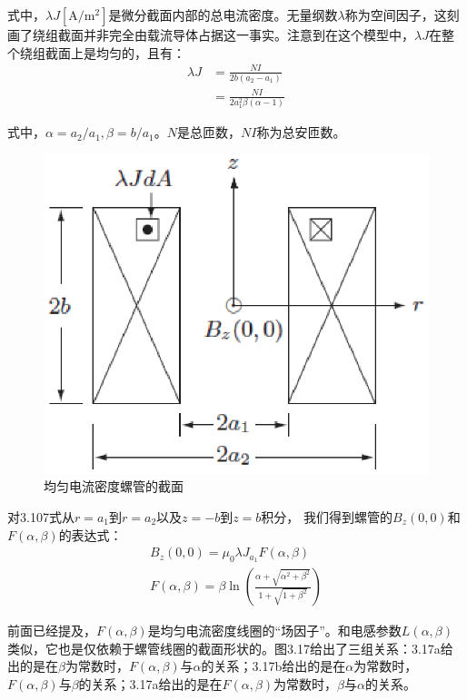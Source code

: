 式中，$\lambda J\mathrm{[A/m^2]}$是微分截面内部的总电流密度。无量纲数$\lambda$称为空间因子，这刻画了绕组截面并非完全由载流导体占据这一事实。注意到在这个模型中，$\lambda J$在整个绕组截面上是均匀的，且有：
\begin{equation}
\begin{split}
\lambda J&=\frac{NI}{2b(a_2-a_1)}\\
&=\frac{NI}{2a_1^2\beta(\alpha-1)}%
\end{split}
\end{equation}

式中，$\alpha=a_2/a_1,\beta=b/a_1$。$N$是总匝数，$NI$称为总安匝数。
\begin{figure}[htbp]
  \centering
 \includegraphics[scale=0.7]{chpt3/figs/fig3.16.eps}
  \caption{均匀电流密度螺管的截面}
\end{figure}

对3.107式从$r=a_1$到$r=a_2$以及$z=-b$到$z=b$积分，
我们得到螺管的$B_z(0,0)$和$F(\alpha,\beta)$的表达式：
\begin{eqnarray}
B_z(0,0)=\mu_0\lambda J_{a_1}F(\alpha,\beta)\\ %
F(\alpha,\beta)=\beta \ln\left(\frac{\alpha+\sqrt{\alpha^2+\beta^2}}{1+\sqrt{1+\beta^2}}\right)
\end{eqnarray}

前面已经提及，$F(\alpha,\beta)$是均匀电流密度线圈的“场因子”。和电感参数$L(\alpha,\beta)$类似，它也是仅依赖于螺管线圈的截面形状的。图3.17给出了三组关系：3.17a给出的是在$\beta$为常数时，$F(\alpha,\beta)$与$\alpha$的关系；3.17b给出的是在$\alpha$为常数时，$F(\alpha,\beta)$与$\beta$的关系；3.17a给出的是在$F(\alpha,\beta)$为常数时，$\beta$与$\alpha$的关系。

